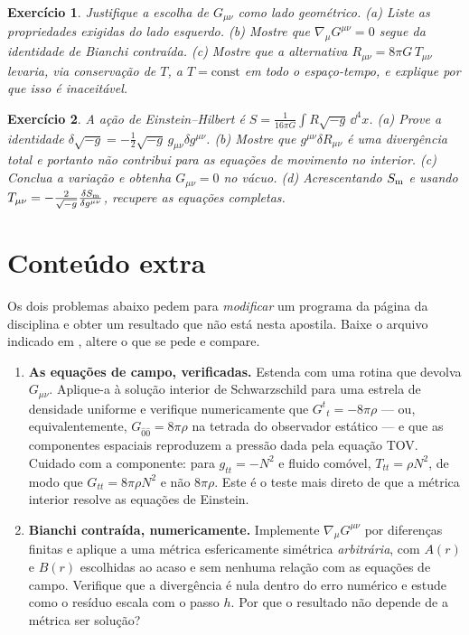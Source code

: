 \documentclass[12pt,a4paper,oneside]{book}
\theoremstyle{rgplain}
\newtheorem{exercise}{Exercício}[chapter]
\theoremstyle{rgremark}
\begin{document}
\begin{exercise}
Justifique a escolha de $G_{\mu\nu}$ como lado geométrico. (a) Liste as
propriedades exigidas do lado esquerdo. (b) Mostre que
$\nabla_\mu G^{\mu\nu}=0$ segue da identidade de Bianchi contraída.
(c) Mostre que a alternativa $R_{\mu\nu}=8\pi G\,T_{\mu\nu}$ levaria, via
conservação de $T$, a $T=\text{const}$ em todo o espaço-tempo, e explique por
que isso é inaceitável.
\end{exercise}

\begin{exercise}
\dificilforaschutz{}
A ação de Einstein--Hilbert é
$S=\frac{1}{16\pi G}\int R\sqrt{-g}\,\dd^4x$.
(a) Prove a identidade $\delta\sqrt{-g}=-\tfrac12\sqrt{-g}\,g_{\mu\nu}
\delta g^{\mu\nu}$. (b) Mostre que $g^{\mu\nu}\delta R_{\mu\nu}$ é uma
divergência total e portanto não contribui para as equações de movimento no
interior. (c) Conclua a variação e obtenha $G_{\mu\nu}=0$ no vácuo.
(d) Acrescentando $S_{\rm m}$ e usando
$T_{\mu\nu}=-\frac{2}{\sqrt{-g}}\frac{\delta S_{\rm m}}{\delta g^{\mu\nu}}$,
recupere as equações completas.
\end{exercise}


\section{Conteúdo extra}

Os dois problemas abaixo pedem para \emph{modificar} um programa da página da disciplina e obter um resultado que não está nesta apostila. Baixe o arquivo indicado em \href{\rgsitecodigos}{\texttt{\rgsitecodigos}}, altere o que se pede e compare.

\begin{enumerate}
  \item \textbf{As equações de campo, verificadas.} Estenda
 com uma rotina que devolva $G_{\mu\nu}$.
Aplique-a à solução interior de Schwarzschild para uma estrela de densidade
uniforme e verifique numericamente que $G^{t}{}_{t}=-8\pi\rho$ --- ou,
equivalentemente, $G_{\hat0\hat0}=8\pi\rho$ na tetrada do observador
estático --- e que as componentes espaciais reproduzem a pressão dada pela
equação TOV. Cuidado com a componente: para $g_{tt}=-N^{2}$ e fluido
comóvel, $T_{tt}=\rho N^{2}$, de modo que $G_{tt}=8\pi\rho N^{2}$ e não
$8\pi\rho$. Este é o teste mais
direto de que a métrica interior resolve as equações de Einstein.

  \item \textbf{Bianchi contraída, numericamente.} Implemente
$\nabla_\mu G^{\mu\nu}$ por diferenças finitas e aplique a uma métrica
esfericamente simétrica \emph{arbitrária}, com $A(r)$ e $B(r)$ escolhidas ao
acaso e sem nenhuma relação com as equações de campo. Verifique que a
divergência é nula dentro do erro numérico e estude como o resíduo escala
com o passo $h$. Por que o resultado não depende de a métrica ser solução?
\end{enumerate}
\end{document}
